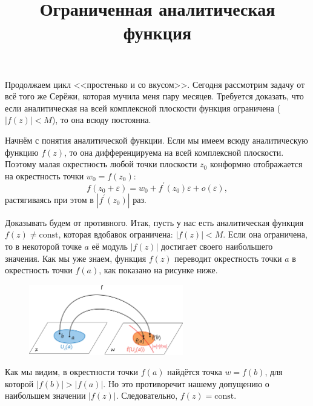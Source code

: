 \documentclass{ncc}
\title{Ограниченная аналитическая функция}
\begin{document}
\maketitle

Продолжаем цикл <<простенько и со вкусом>>. Сегодня рассмотрим задачу от всё того же Серёжи, которая мучила меня пару месяцев. Требуется доказать, что если аналитическая на всей комплексной плоскости функция ограничена (\(|f(z)| < M\)), то она всюду постоянна.

Начнём с понятия аналитической функции. Если мы имеем всюду аналитическую функцию \( f(z) \), то она дифференцируема на всей комплексной плоскости. Поэтому малая окрестность любой точки плоскости \( z_0 \) конформно отображается на окрестность точки \( w_0 = f(z_0) \):
\[
    f(z_0 + \varepsilon) = w_0 + f^\prime(z_0)\varepsilon + o(\varepsilon),
\]
растягиваясь при этом в \( |f^\prime(z_0)| \) раз.

Доказывать будем от противного. Итак, пусть у нас есть аналитическая функция \( f(z) \ne \mathrm{const} \), которая вдобавок ограничена: \( |f(z)| < M \). Если она ограничена, то в некоторой точке \( a \) её модуль \(|f(z)|\) достигает своего наибольшего значения. Как мы уже знаем, функция \( f(z) \) переводит окрестность точки \( a \) в окрестность точки \( f(a) \), как показано на рисунке ниже.

\begin{figure}[h]
    \center
    \includegraphics[width=0.6\textwidth]{2016-05-27-analytic-function.png}
\end{figure}

Как мы видим, в окрестности точки \( f(a) \) найдётся точка \( w = f(b) \), для которой \( |f(b)| > |f(a)| \). Но это противоречит нашему допущению о наибольшем значении \( |f(z)| \). Следовательно, \( f(z) = \mathrm{const} \).
\end{document}
